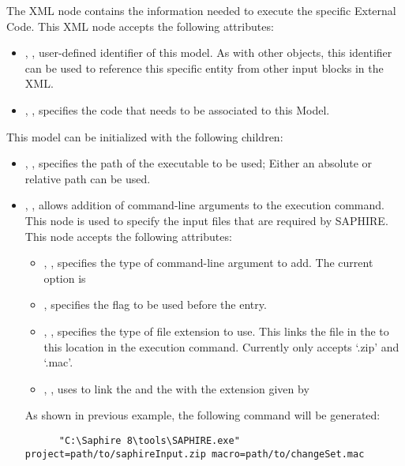 The  XML node contains the information needed to execute the specific External Code. This
XML node accepts the following attributes:
\begin{itemize}
  \item {}, , user-defined identifier of this model.
    \nb As with other objects, this identifier can be used to reference this specific entity from other input
    blocks in the XML.
  \item {}, , specifies the code that needs to be
    associated to this Model.
\end{itemize}
This model can be initialized with the following children:
\begin{itemize}
  \item {}, , specifies the path of the executable to
    be used; \nb Either an absolute or relative path can be used.
  \item {}, , allows addition of command-line arguments to
    the execution command. This node is used to specify the input files that are required by SAPHIRE.
    This node accepts the following attributes:
    \begin{itemize}
      \item {}, , specifies the type of command-line argument
        to add. The current option is 
      \item {},  specifies the flag to be used before the entry.
      \item {}, , specifies the type of file extension
        to use. This links the  file in the  to this location in the execution
        command. Currently only accepts `.zip' and `.mac'.
      \item {}, , uses to link the  and the
         with the extension given by 
    \end{itemize}
    \nb As shown in previous example, the following command will be generated:
    \begin{lstlisting}
      "C:\Saphire 8\tools\SAPHIRE.exe" project=path/to/saphireInput.zip macro=path/to/changeSet.mac
    \end{lstlisting}

\end{itemize}
